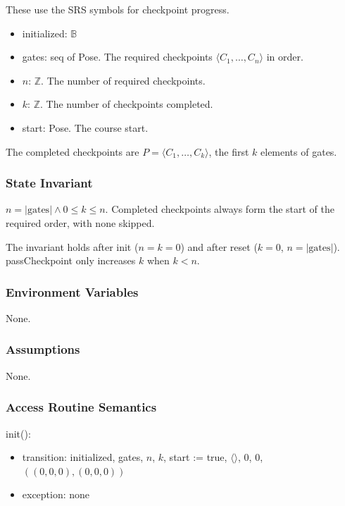 \documentclass[12pt, titlepage]{article}
\newcommand{\True}{\textnormal{true}}
\begin{document}
These use the SRS symbols for checkpoint progress.

\begin{itemize}
\item initialized: $\mathbb{B}$
\item gates: seq of Pose. The required checkpoints $\langle C_1, \ldots, C_n
  \rangle$ in order.
\item $n$: $\mathbb{Z}$. The number of required checkpoints.
\item $k$: $\mathbb{Z}$. The number of checkpoints completed.
\item start: Pose. The course start.
\end{itemize}

The completed checkpoints are $P = \langle C_1, \ldots, C_k \rangle$, the first
$k$ elements of gates.

\subsubsection{State Invariant}

$n = |\text{gates}| \wedge 0 \leq k \leq n$. Completed checkpoints always form
the start of the required order, with none skipped.

The invariant holds after init ($n = k = 0$) and after reset ($k = 0$, $n =
|\text{gates}|$). passCheckpoint only increases $k$ when $k < n$.

\subsubsection{Environment Variables}

None.

\subsubsection{Assumptions}

None.

\subsubsection{Access Routine Semantics}

\noindent init():
\begin{itemize}
\item transition: initialized, gates, $n$, $k$, start := \True,
  $\langle\rangle$, 0, 0, $((0,0,0), (0,0,0))$
\item exception: none
\end{itemize}
\end{document}
